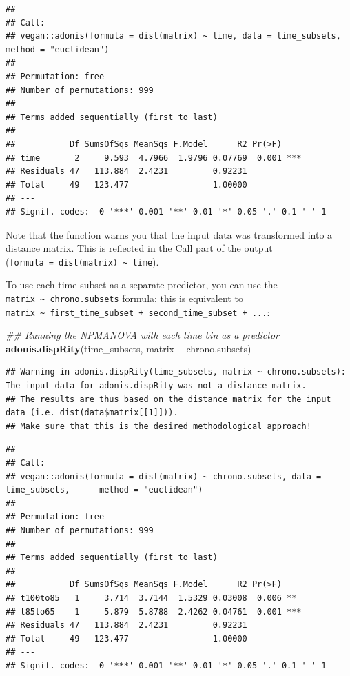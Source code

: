 \documentclass[]{book}
\newenvironment{Shaded}{\begin{snugshade}}{\end{snugshade}}
\newcommand{\CommentTok}[1]{\textcolor[rgb]{0.56,0.35,0.01}{\textit{#1}}}
\newcommand{\KeywordTok}[1]{\textcolor[rgb]{0.13,0.29,0.53}{\textbf{#1}}}
\newcommand{\NormalTok}[1]{#1}
\newcommand{\OperatorTok}[1]{\textcolor[rgb]{0.81,0.36,0.00}{\textbf{#1}}}
\newcommand{\StringTok}[1]{\textcolor[rgb]{0.31,0.60,0.02}{#1}}
\begin{document}
\begin{verbatim}
## 
## Call:
## vegan::adonis(formula = dist(matrix) ~ time, data = time_subsets,      method = "euclidean") 
## 
## Permutation: free
## Number of permutations: 999
## 
## Terms added sequentially (first to last)
## 
##           Df SumsOfSqs MeanSqs F.Model      R2 Pr(>F)    
## time       2     9.593  4.7966  1.9796 0.07769  0.001 ***
## Residuals 47   113.884  2.4231         0.92231           
## Total     49   123.477                 1.00000           
## ---
## Signif. codes:  0 '***' 0.001 '**' 0.01 '*' 0.05 '.' 0.1 ' ' 1
\end{verbatim}

Note that the function warns you that the input data was transformed into a distance matrix.
This is reflected in the Call part of the output (\texttt{formula\ =\ dist(matrix)\ \textasciitilde{}\ time}).

To use each time subset as a separate predictor, you can use the \texttt{matrix\ \textasciitilde{}\ chrono.subsets} formula; this is equivalent to \texttt{matrix\ \textasciitilde{}\ first\_time\_subset\ +\ second\_time\_subset\ +\ ...}:

\begin{Shaded}
\begin{Highlighting}[]
\CommentTok{## Running the NPMANOVA with each time bin as a predictor}
\KeywordTok{adonis.dispRity}\NormalTok{(time_subsets, matrix }\OperatorTok{~}\StringTok{ }\NormalTok{chrono.subsets)}
\end{Highlighting}
\end{Shaded}

\begin{verbatim}
## Warning in adonis.dispRity(time_subsets, matrix ~ chrono.subsets): The input data for adonis.dispRity was not a distance matrix.
## The results are thus based on the distance matrix for the input data (i.e. dist(data$matrix[[1]])).
## Make sure that this is the desired methodological approach!
\end{verbatim}

\begin{verbatim}
## 
## Call:
## vegan::adonis(formula = dist(matrix) ~ chrono.subsets, data = time_subsets,      method = "euclidean") 
## 
## Permutation: free
## Number of permutations: 999
## 
## Terms added sequentially (first to last)
## 
##           Df SumsOfSqs MeanSqs F.Model      R2 Pr(>F)    
## t100to85   1     3.714  3.7144  1.5329 0.03008  0.006 ** 
## t85to65    1     5.879  5.8788  2.4262 0.04761  0.001 ***
## Residuals 47   113.884  2.4231         0.92231           
## Total     49   123.477                 1.00000           
## ---
## Signif. codes:  0 '***' 0.001 '**' 0.01 '*' 0.05 '.' 0.1 ' ' 1
\end{verbatim}
\end{document}
